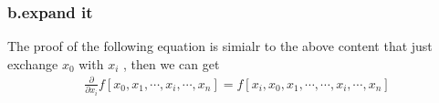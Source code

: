 \documentclass[twoside,a4paper,12pt]{article}
\begin{document}
\subsubsection*{b.expand it}
The proof of the following equation is simialr to the above content that just exchange $x_0$ with $x_i$ , then we can get  
\begin{gather}
\frac{\partial}{\partial{x_i}}f[x_0,x_1,\cdots,x_i,\cdots,x_{n}]=f[x_i,x_0,x_1,\cdots,\cdots,x_i,\cdots,x_n]
\end{gather}
\end{document}
